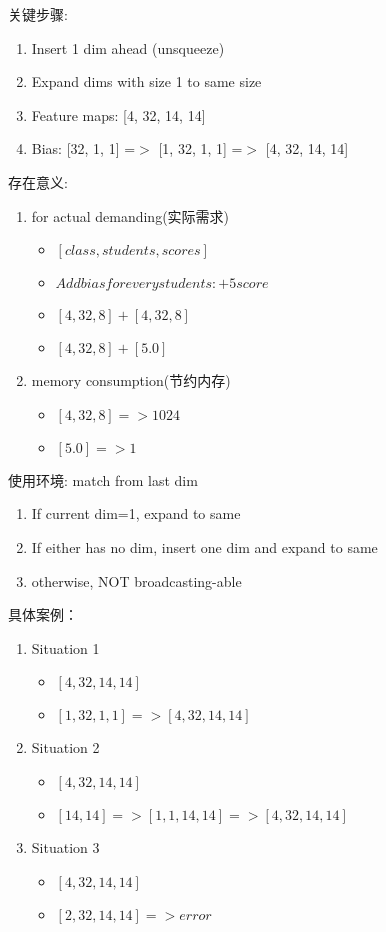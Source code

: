     关键步骤:
    \begin{enumerate}
      \item Insert 1 dim ahead  (unsqueeze)
      \item Expand dims with size 1 to same size
      \item Feature maps: [4, 32, 14, 14]
      \item Bias: [32, 1, 1] =$>$ [1, 32, 1, 1] =$>$ [4, 32, 14, 14]
    \end{enumerate}

    存在意义:
    \begin{enumerate}
      \item for actual demanding(实际需求)
      \begin{itemize}
        \item $[class, students, scores]$
        \item $Add bias for every students: +5 score$
        \item $[4, 32, 8] + [4, 32, 8]$
        \item $[4, 32, 8] + [5.0]$
      \end{itemize}
      \item memory consumption(节约内存)
      \begin{itemize}
        \item $[4, 32, 8] => 1024$
        \item $[5.0] => 1 $
      \end{itemize}
    \end{enumerate}

    使用环境:  match from last dim
    \begin{enumerate}
      \item If current dim=1, expand to same
      \item If either has no dim, insert one dim and expand to same
      \item otherwise, NOT broadcasting-able
    \end{enumerate}

    具体案例：
    \begin{enumerate}
      \item Situation 1
      \begin{itemize}
        \item $[4, 32, 14, 14]$
        \item $[1, 32, 1, 1] => [4, 32, 14, 14]$
      \end{itemize}
      \item Situation 2
      \begin{itemize}
        \item $[4, 32, 14, 14]$
        \item $[14, 14] => [1, 1, 14, 14] => [4, 32, 14, 14]$
      \end{itemize}
      \item Situation 3
      \begin{itemize}
        \item $[4, 32, 14, 14]$
        \item $[2, 32, 14, 14] => error$
      \end{itemize}
    \end{enumerate}

